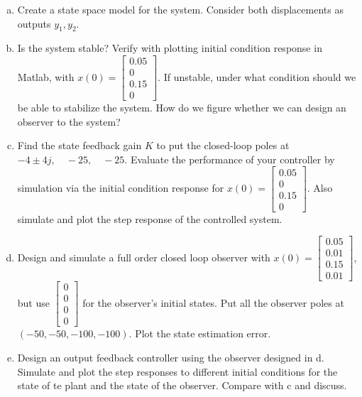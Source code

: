 \documentclass{article}
\begin{document}
\begin{enumerate}[a.]
\item Create a state space model for the system. Consider both displacements as outputs $y_1,y_2$.
\newline

\item Is the system stable?
Verify with plotting initial condition response in Matlab, with $x(0) = \begin{bmatrix} 0.05 \\ 0 \\ 0.15 \\ 0 \end{bmatrix}$.
If unstable, under what condition should we be able to stabilize the system.
How do we figure whether we can design an observer to the system?
\newline

\item Find the state feedback gain $K$ to put the closed-loop poles at $ -4 \pm 4j,\quad -25,\quad -25$.
Evaluate the performance of your controller by simulation via the initial condition response for $x(0) = \begin{bmatrix} 0.05 \\ 0 \\ 0.15 \\ 0 \end{bmatrix}$.
Also simulate and plot the step response of the controlled system.
\newline

\item Design and simulate a full order closed loop observer with $x(0) = \begin{bmatrix} 0.05 \\ 0.01 \\ 0.15 \\ 0.01 \end{bmatrix}$, but use $\begin{bmatrix} 0 \\ 0 \\ 0 \\ 0 \end{bmatrix}$ for the observer's initial states.
Put all the observer poles at $ (-50, -50, -100, -100)$.
Plot the state estimation error.
\newline

\item Design an output feedback controller using the observer designed in d.
Simulate and plot the step responses to different initial conditions for the state of te plant and the state of the observer.
Compare with c and discuss.
\newline

\end{enumerate}
\end{document}
